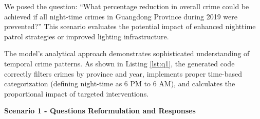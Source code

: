 We posed the question: ``What percentage reduction in overall crime could be achieved if all night-time crimes in Guangdong Province during 2019 were prevented?'' This scenario evaluates the potential impact of enhanced nighttime patrol strategies or improved lighting infrastructure.

The model's analytical approach demonstrates sophisticated understanding of temporal crime patterns. As shown in Listing \ref{lst:q1}, the generated code correctly filters crimes by province and year, implements proper time-based categorization (defining night-time as 6 PM to 6 AM), and calculates the proportional impact of targeted interventions.






\noindent \textbf{Scenario 1 - Questions Reformulation and Responses}

